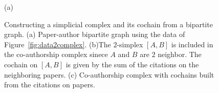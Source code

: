 \begin{figure}[htpb]
%
\settowidth{\tempwidth}{\usebox{\tempbox}}%
\hfil\begin{minipage}[b]{\tempwidth}%
\raisebox{-\height}{\usebox{\tempbox}}%
\scriptsize{\caption*{(a)}}%
\end{minipage}%
%
\settowidth{\tempwidth}{\usebox{\tempbox}}%
\hfil\begin{minipage}[b]{\tempwidth}%
\raisebox{-\height}{\usebox{\tempbox}}%
\scriptsize{}%
\end{minipage}%
\vspace{5pt}
\settowidth{\tempwidth}{\usebox{\tempbox}}%
\hfil\begin{minipage}[b]{\tempwidth}%
\raisebox{-\height}{\usebox{\tempbox}}%
\scriptsize{}%
\end{minipage}%
\caption{Constructing a simplicial complex and its cochain from a bipartite graph. (a) Paper-author bipartite graph using the data of Figure~\ref{fig:data2complex}. (b)The $2$-simplex $[A,B]$ is included in the co-authorship complex sinece $A$ and $B$ are $2$ neighbor. The cochain on $[A,B]$ is given by the sum of the citations on the neighboring papers. (c) Co-authorship complex with cochains built from the citations on papers.}\label{fig:bipartite}
\end{figure}



